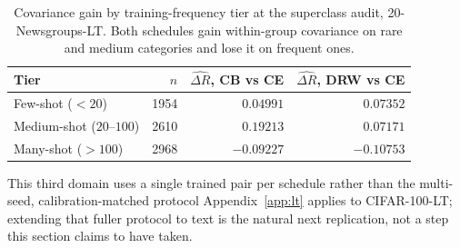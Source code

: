 \begin{table}[t]
\centering
\caption{Covariance gain by training-frequency tier at the superclass audit,
20-Newsgroups-LT. Both schedules gain within-group covariance on rare and medium categories
and lose it on frequent ones.}
\label{tab:textlt-tier}
\begin{tabular}{@{}lrrr@{}}
\toprule
Tier & $n$ & $\widehat{\Delta R}$, CB vs CE & $\widehat{\Delta R}$, DRW vs CE \\
\midrule
Few-shot ($<20$)          & 1954 & $0.04991$  & $0.07352$  \\
Medium-shot ($20$--$100$) & 2610 & $0.19213$  & $0.07171$  \\
Many-shot ($>100$)        & 2968 & $-0.09227$ & $-0.10753$ \\
\bottomrule
\end{tabular}
\end{table}

This third domain uses a single trained pair per schedule rather than the multi-seed,
calibration-matched protocol Appendix~\ref{app:lt} applies to CIFAR-100-LT; extending
that fuller protocol to text is the natural next replication, not a step this section
claims to have taken.
